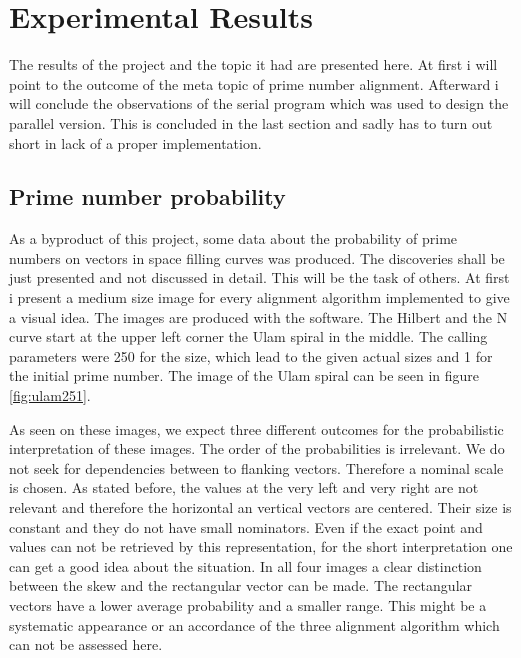 \section{Experimental Results}
\label{sec:results}
The results of the project and the topic it had are presented here. At first i will point to the outcome of the meta topic of prime number alignment. Afterward i will conclude the observations of the serial program which was used to design the parallel version. This is concluded in the last section and sadly has to turn out short in lack of a proper implementation.

\subsection{Prime number probability}
\label{sec:resprob}
As a byproduct of this project, some data about the probability of prime numbers on vectors in space filling curves was produced. The discoveries shall be just presented and not discussed in detail. This will be the task of others. At first i present a medium size image for every alignment algorithm implemented to give a visual idea. The images are produced with the software. The Hilbert and the N curve start at the upper left corner the Ulam spiral in the middle. The calling parameters were 250 for the size, which lead to the given actual sizes and 1 for the initial prime number. The image of the Ulam spiral can be seen in figure \ref{fig:ulam251}.

\begin{figure}[H]
\begin{minipage}[t]{0.475\textwidth}
\centering
\end{minipage}
\hfill
\begin{minipage}[t]{0.475\textwidth}
\centering
\end{minipage}
\end{figure}

As seen on these images, we expect three different outcomes for the probabilistic interpretation of these images. The order of the probabilities is irrelevant. We do not seek for dependencies between to flanking vectors. Therefore a nominal scale is chosen. As stated before, the values at the very left and very right are not relevant and therefore the horizontal an vertical vectors are centered. Their size is constant and they do not have small nominators. Even if the exact point and values can not be retrieved by this representation, for the short interpretation one can get a good idea about the situation.
In all four images a clear distinction between the skew and the rectangular vector can be made. The rectangular vectors have a lower average probability and a smaller range. This might be a systematic appearance or an accordance of the three alignment algorithm which can not be assessed here.

